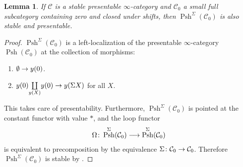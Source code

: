 \documentclass[10pt]{amsart}
\numberwithin{equation}{section}
\newtheorem{lem}[prop]{Lemma}
\theoremstyle{definition}
\DeclareMathOperator{\Psh}{Psh}
\newcommand{\cC}{\mathcal{C}}
\renewcommand{\to}{\mathchoice{\longrightarrow}{\rightarrow}{}{}}
\begin{document}
\begin{lem}\label{lem:Psh_sigma_is_stable}
	If $\cC$ is a stable presentable $\infty$-category and $\cC_{0}$ a small full subcategory containing zero and closed under shifts, then $\Psh^{\Sigma}(\cC_{0})$ is also stable and presentable.
\end{lem}

\begin{proof}
	$\Psh^{\Sigma}(\cC_{0})$ is a left-localization of the presentable $\infty$-category $\Psh(\cC_{0})$ at the collection of morphisms:
	\begin{enumerate}
		\item $\emptyset \to y(0)$.
		\item $y(0) \underset{y(X)}{\coprod} y(0) \to y(\Sigma X)$ for all $X$.
	\end{enumerate}
	This takes care of presentability.
	Furthermore,  $\Psh^{\Sigma}(\cC_{0})$ is pointed at the constant functor with value $\ast$, and the loop functor
	\begin{align*}
		\Omega \colon \Psh^{\Sigma}(\cC_{0}) \to \Psh^{\Sigma}(\cC_{0})
	\end{align*}
	is equivalent to precomposition by the equivalence $\Sigma\colon \cC_{0} \to \cC_{0}$.
	Therefore $\Psh^{\Sigma}(\cC_{0})$ is stable by \cite{HA}.
\end{proof}
\end{document}
